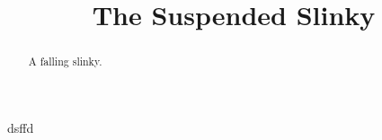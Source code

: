 \documentclass{ximera}
\title{The Suspended Slinky}
\begin{document}
\begin{abstract}
A falling slinky.
\end{abstract}
\maketitle

dsffd
\end{document}
